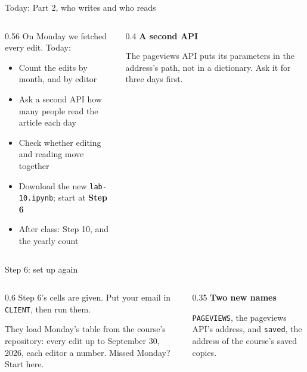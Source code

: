 \documentclass[9pt,aspectratio=169]{beamer}
\begin{document}
\begin{frame}{Today: Part 2, who writes and who reads}
    \begin{columns}[T]
        \begin{column}{0.56\textwidth}
            On Monday we fetched every edit. Today:
            \begin{itemize}\small
                \item Count the edits by month, and by editor
                \item Ask a second API how many people read the article each day
                \item Check whether editing and reading move together
            \end{itemize}

            \medskip
            \begin{itemize}\small
                \item Download the new \texttt{lab-10.ipynb}; start at \textbf{Step 6}
                \item After class: Step 10, and the yearly count
            \end{itemize}
        \end{column}
        \begin{column}{0.4\textwidth}
            \textbf{A second API}\\[2pt]
            {\footnotesize The pageviews API puts its parameters in the address's path, not in a dictionary. Ask it for three days first.\par}
        \end{column}
    \end{columns}
\end{frame}

\begin{frame}{Step 6: set up again}
    \begin{columns}[T]
        \begin{column}{0.6\textwidth}
            Step 6's cells are given. Put your email in \texttt{CLIENT}, then run them.

            \medskip
            They load Monday's table from the course's repository: every edit up to September 30, 2026, each editor a number. Missed Monday? Start here.
        \end{column}
        \begin{column}{0.35\textwidth}
            \textbf{Two new names}\\[2pt]
            {\footnotesize \texttt{PAGEVIEWS}, the pageviews API's address, and \texttt{saved}, the address of the course's saved copies.\par}
        \end{column}
    \end{columns}
\end{frame}
\end{document}
